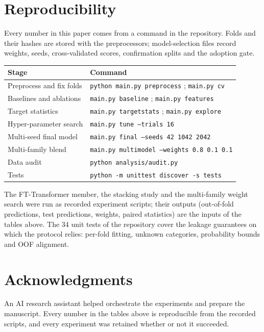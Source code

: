 \section{Reproducibility}
Every number in this paper comes from a command in the repository. Folds and their hashes are
stored with the preprocessors; model-selection files record weights, seeds, cross-validated
scores, confirmation splits and the adoption gate.

\begin{center}
\small
\begin{tabular}{ll}
\toprule
Stage & Command\\
\midrule
Preprocess and fix folds        & \texttt{python main.py preprocess} ; \texttt{main.py cv}\\
Baselines and ablations         & \texttt{main.py baseline} ; \texttt{main.py features}\\
Target statistics               & \texttt{main.py targetstats} ; \texttt{main.py explore}\\
Hyper-parameter search          & \texttt{main.py tune --trials 16}\\
Multi-seed final model          & \texttt{main.py final --seeds 42 1042 2042}\\
Multi-family blend              & \texttt{main.py multimodel --weights 0.8 0.1 0.1}\\
Data audit                      & \texttt{python analysis/audit.py}\\
Tests                           & \texttt{python -m unittest discover -s tests}\\
\bottomrule
\end{tabular}
\end{center}

The FT-Transformer member, the stacking study and the multi-family weight search were run as
recorded experiment scripts; their outputs (out-of-fold predictions, test predictions, weights,
paired statistics) are the inputs of the tables above. The 34 unit tests of the repository
cover the leakage guarantees on which the protocol relies: per-fold fitting, unknown categories,
probability bounds and OOF alignment.

\section*{Acknowledgments}
An AI research assistant helped orchestrate the experiments and prepare the manuscript. Every
number in the tables above is reproducible from the recorded scripts, and every experiment was
retained whether or not it succeeded.



